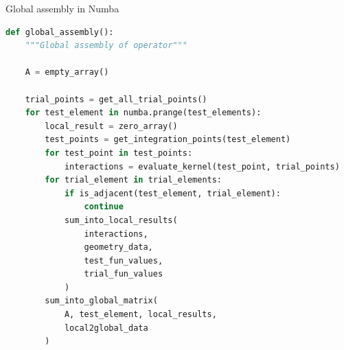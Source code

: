 \documentclass[dvipsnames,10pt]{beamer}
\begin{document}
\begin{frame}[fragile]{Global assembly in Numba}

{\footnotesize
\begin{lstlisting}[language=Python]
def global_assembly():
    """Global assembly of operator"""
    
    A = empty_array()
    
    trial_points = get_all_trial_points()
    for test_element in numba.prange(test_elements):
        local_result = zero_array()
        test_points = get_integration_points(test_element)
        for test_point in test_points:
            interactions = evaluate_kernel(test_point, trial_points)
        for trial_element in trial_elements:
            if is_adjacent(test_element, trial_element):
                continue
            sum_into_local_results(
                interactions,
                geometry_data,
                test_fun_values,
                trial_fun_values
            )
        sum_into_global_matrix(
            A, test_element, local_results,
            local2global_data
        )
\end{lstlisting}
}

\end{frame}
\end{document}
